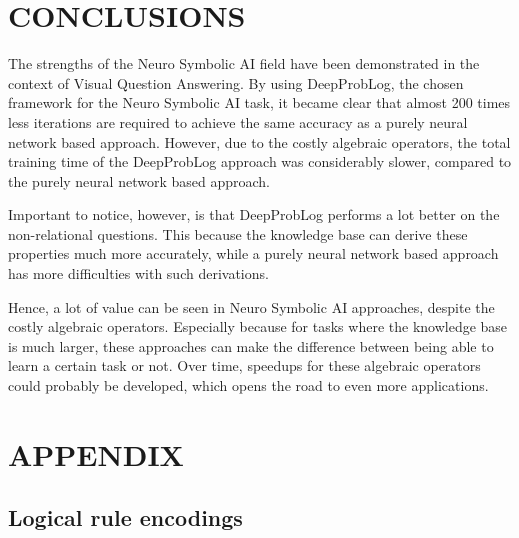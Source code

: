 \documentclass[english]{sobraep}
\begin{document}
\section{CONCLUSIONS}
\label{sec:conclusions}
The strengths of the Neuro Symbolic AI field have been demonstrated in the context of Visual Question Answering. By using DeepProbLog, the chosen framework for the Neuro Symbolic AI task, it became clear that almost 200 times less iterations are required to achieve the same accuracy as a purely neural network based approach. However, due to the costly algebraic operators, the total training time of the DeepProbLog approach was considerably slower, compared to the purely neural network based approach. 

Important to notice, however, is that DeepProbLog performs a lot better on the non-relational questions. This because the knowledge base can derive these properties much more accurately, while a purely neural network based approach has more difficulties with such derivations.

Hence, a lot of value can be seen in Neuro Symbolic AI approaches, despite the costly algebraic operators. Especially because for tasks where the knowledge base is much larger, these approaches can make the difference between being able to learn a certain task or not. Over time, speedups for these algebraic operators could probably be developed, which opens the road to even more applications.


 

\section*{APPENDIX}
\subsection{Logical rule encodings}
\label{appendix:logical_rule_encodings}
\inputminted[breaklines]{prolog}{"/home/jorrit/Data/KU Leuven/Semester 12/Capita Selecta H05N0a/deepproblog/src/deepproblog/examples/SORTOFCLEVR/model.pl"}

\end{document}
